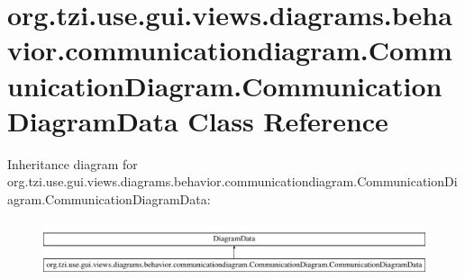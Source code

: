 \hypertarget{classorg_1_1tzi_1_1use_1_1gui_1_1views_1_1diagrams_1_1behavior_1_1communicationdiagram_1_1_commufbba68d0542edec6da2ea3d0e02dfce8}{\section{org.\-tzi.\-use.\-gui.\-views.\-diagrams.\-behavior.\-communicationdiagram.\-Communication\-Diagram.\-Communication\-Diagram\-Data Class Reference}
\label{classorg_1_1tzi_1_1use_1_1gui_1_1views_1_1diagrams_1_1behavior_1_1communicationdiagram_1_1_commufbba68d0542edec6da2ea3d0e02dfce8}
}
Inheritance diagram for org.\-tzi.\-use.\-gui.\-views.\-diagrams.\-behavior.\-communicationdiagram.\-Communication\-Diagram.\-Communication\-Diagram\-Data\-:\begin{figure}[H]
\begin{center}
\leavevmode
\includegraphics[height=1.659259cm]{classorg_1_1tzi_1_1use_1_1gui_1_1views_1_1diagrams_1_1behavior_1_1communicationdiagram_1_1_commufbba68d0542edec6da2ea3d0e02dfce8}
\end{center}
\end{figure}
